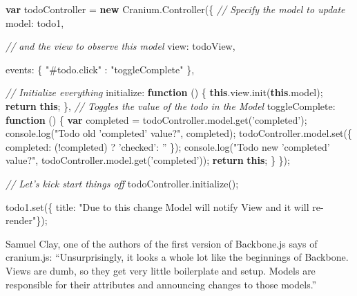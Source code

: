 \documentclass[9pt]{book}
\newenvironment{Shaded}{}{}
\newcommand{\KeywordTok}[1]{\textcolor[rgb]{0.00,0.44,0.13}{\textbf{{#1}}}}
\newcommand{\DataTypeTok}[1]{\textcolor[rgb]{0.56,0.13,0.00}{{#1}}}
\newcommand{\StringTok}[1]{\textcolor[rgb]{0.25,0.44,0.63}{{#1}}}
\newcommand{\CommentTok}[1]{\textcolor[rgb]{0.38,0.63,0.69}{\textit{{#1}}}}
\newcommand{\OtherTok}[1]{\textcolor[rgb]{0.00,0.44,0.13}{{#1}}}
\newcommand{\FunctionTok}[1]{\textcolor[rgb]{0.02,0.16,0.49}{{#1}}}
\newcommand{\NormalTok}[1]{{#1}}
\begin{document}
\begin{Shaded}
\begin{Highlighting}[]
\KeywordTok{var} \NormalTok{todoController = }\KeywordTok{new} \OtherTok{Cranium}\NormalTok{.}\FunctionTok{Controller}\NormalTok{(\{}
  \CommentTok{// Specify the model to update}
  \DataTypeTok{model}\NormalTok{: todo1,}

  \CommentTok{// and the view to observe this model}
  \DataTypeTok{view}\NormalTok{:  todoView,}

  \DataTypeTok{events}\NormalTok{: \{}
    \StringTok{"#todo.click"} \NormalTok{: }\StringTok{"toggleComplete"}
  \NormalTok{\},}

  \CommentTok{// Initialize everything}
  \DataTypeTok{initialize}\NormalTok{: }\KeywordTok{function} \NormalTok{() \{}
    \KeywordTok{this}\NormalTok{.}\OtherTok{view}\NormalTok{.}\FunctionTok{init}\NormalTok{(}\KeywordTok{this}\NormalTok{.}\FunctionTok{model}\NormalTok{);}
    \KeywordTok{return} \KeywordTok{this}\NormalTok{;}
  \NormalTok{\},}
  \CommentTok{// Toggles the value of the todo in the Model}
  \DataTypeTok{toggleComplete}\NormalTok{: }\KeywordTok{function} \NormalTok{() \{}
    \KeywordTok{var} \NormalTok{completed = }\OtherTok{todoController}\NormalTok{.}\OtherTok{model}\NormalTok{.}\FunctionTok{get}\NormalTok{(}\StringTok{'completed'}\NormalTok{);}
    \OtherTok{console}\NormalTok{.}\FunctionTok{log}\NormalTok{(}\StringTok{"Todo old 'completed' value?"}\NormalTok{, completed);}
    \OtherTok{todoController}\NormalTok{.}\OtherTok{model}\NormalTok{.}\FunctionTok{set}\NormalTok{(\{ }\DataTypeTok{completed}\NormalTok{: (!completed) ? }\StringTok{'checked'}\NormalTok{: }\StringTok{''} \NormalTok{\});}
    \OtherTok{console}\NormalTok{.}\FunctionTok{log}\NormalTok{(}\StringTok{"Todo new 'completed' value?"}\NormalTok{, }\OtherTok{todoController}\NormalTok{.}\OtherTok{model}\NormalTok{.}\FunctionTok{get}\NormalTok{(}\StringTok{'completed'}\NormalTok{));}
    \KeywordTok{return} \KeywordTok{this}\NormalTok{;}
  \NormalTok{\}}
\NormalTok{\});}


\CommentTok{// Let's kick start things off}
\OtherTok{todoController}\NormalTok{.}\FunctionTok{initialize}\NormalTok{();}

\OtherTok{todo1}\NormalTok{.}\FunctionTok{set}\NormalTok{(\{ }\DataTypeTok{title}\NormalTok{: }\StringTok{"Due to this change Model will notify View and it will re-render"}\NormalTok{\});}
\end{Highlighting}
\end{Shaded}

Samuel Clay, one of the authors of the first version of Backbone.js says
of cranium.js: ``Unsurprisingly, it looks a whole lot like the
beginnings of Backbone. Views are dumb, so they get very little
boilerplate and setup. Models are responsible for their attributes and
announcing changes to those models.''
\end{document}
